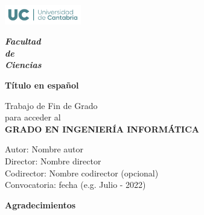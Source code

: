 \documentclass{article}
\begin{document}
	\begin{titlepage}
		{\selectfont
			\begin{center}
				\vspace*{-2.5cm}
				
				\includegraphics[width=0.25\textwidth]{images/logoUC}
				
				\vspace{0.2cm}
				\textbf{\Huge\emph{Facultad \\
						de\\
						Ciencias}}
				
				\vspace{1cm}
				\textbf{\fontsize{20}{24}\selectfont Título en español}\\
				\fontsize{19}{24}\selectfont {Título en inglés}
				
				\vspace{1.5cm}
				\fontsize{14}{17}\selectfont Trabajo de Fin de Grado\\
				para acceder al\\
                \vspace{0.5cm}
				\textbf{\fontsize{17}{20}\selectfont GRADO EN INGENIERÍA INFORMÁTICA}
				
				\vfill
				
				
				\vspace{0.8cm}
				
				
				\begin{flushright}
					\fontsize{14}{17}
					Autor: Nombre autor\\
					Director: Nombre director\\
					Codirector: Nombre codirector (opcional)\\
					Convocatoria: fecha (e.g. Julio - 2022)
				\end{flushright}
				
				
		\end{center}}
	\end{titlepage}


\newpage
\begin{center}
{\bf \Huge Agradecimientos}
\end{center}
\vspace{1cm}
\setlength{\baselineskip}{0.8cm}
\onehalfspacing
\begin{flushleft}



\end{flushleft}
\end{document}
